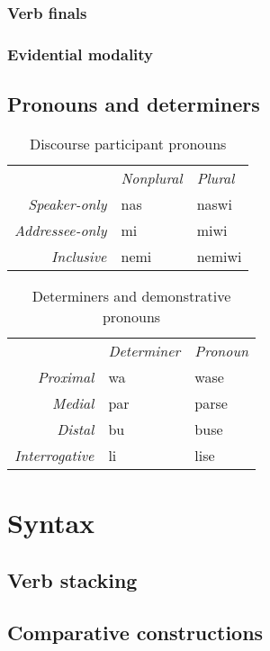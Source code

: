 \documentclass[a4paper,10pt,twoside,openright]{memoir}
\begin{document}
\subsection{Verb finals}

\subsection{Evidential modality}

\section{Pronouns and determiners}

\begin{table}[ht]
    \centering
    \begin{tabular}{rll}
        & \textit{Nonplural} & \textit{Plural} \\
    \textit{Speaker-only} & nas & naswi \\
    \textit{Addressee-only} & mi & miwi \\
    \textit{Inclusive} & nemi & nemiwi \\
    \end{tabular}
    \caption{Discourse participant pronouns}
    \label{tab:firstandsecond}
\end{table}

\begin{table}[ht]
    \centering
    \begin{tabular}{>{\em}rll}
        & \textit{Determiner} & \textit{Pronoun}  \\
    Proximal & wa & wase \\
    Medial & par & parse \\
    Distal & bu & buse \\
    Interrogative & li & lise \\
    \end{tabular}
    \caption{Determiners and demonstrative pronouns}
    \label{tab:determiners}
\end{table}

\chapter{Syntax}

\section{Verb stacking}

\section{Comparative constructions}
\end{document}
